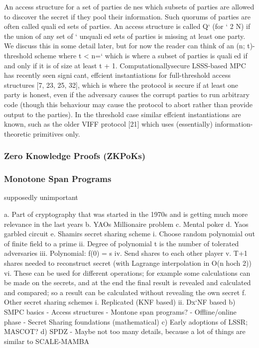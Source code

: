 \documentclass[english,runningheads,a4paper]{llncs}[2018/03/10]
\begin{document}
An access structure for a set of parties denes which subsets of parties are
allowed to discover the secret if they pool their information. Such quorums of
parties are often called qualied sets of parties. An access structure is called Q`
(for ` 2 N) if the union of any set of ` unqualied sets of parties is missing at
least one party. We discuss this in some detail later, but for now the reader can
think of an (n; t)-threshold scheme where t < n=` which is where a subset of
parties is qualied if and only if it is of size at least t + 1. Computationallysecure
LSSS-based MPC has recently seen signicant, effcient instantiations
for full-threshold access structures [7, 23, 25, 32], which is where the protocol is
secure if at least one party is honest, even if the adversary causes the corrupt
parties to run arbitrary code (though this behaviour may cause the protocol to
abort rather than provide output to the parties). In the threshold case similar
effcient instantiations are known, such as the older VIFF protocol [21] which
uses (essentially) information-theoretic primitives only.

\subsubsection{Zero Knowledge Proofs (ZKPoKs)}


\subsubsection{Monotone Span Programs}
supposedly unimportant






a.	Part of cryptography that was started in the 1970s and is getting much more relevance in the last years
b.	YAOs Millionaire problem
c.	Mental poker
d.	Yaos garbled circuit
e.	Shamirs secret sharing scheme
i.	Choose random polynomial out of finite field to a prime
ii.	Degree of polynomial t is the number of tolerated adversaries
iii.	Polynomial: f(0) = s
iv.	Send shares to each other player
v.	 T+1 shares needed to reconstruct secret (with Lagrange interpolation in O(n hoch 2))
vi.	These can be used for different operations; for example some calculations can be made on the secrets, and at the end the final result is revealed and calculated and compared; so a result can be calculated without revealing the own secret
f.	Other secret sharing schemes
i.	Replicated (KNF based)
ii.	Dx`NF based
b)	SMPC basics
-	Access structures
-	Montone span programs?
-	Offline/online phase
-	Secret Sharing foundations (mathematical)
c)	Early adoptions of LSSR; MASCOT?
d)	SPDZ
-	Maybe not too many details, because a lot of things are similar to SCALE-MAMBA
\end{document}

